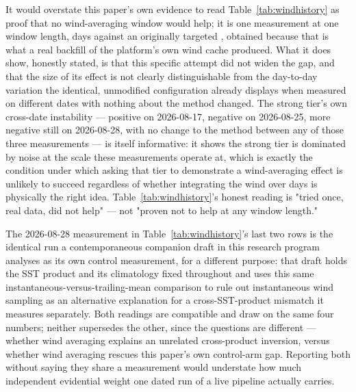  It would overstate
this paper's own evidence to read Table~\ref{tab:windhistory} as proof that
no wind-averaging window would help; it is one measurement at one window
length, \WindHistoryActualWindowDays{} days against an originally targeted
\WindHistoryTargetWindowDays{}, obtained because that is what a real
backfill of the platform's own wind cache produced. What it does show,
honestly stated, is that this specific attempt did not widen the gap, and
that the size of its effect is not clearly distinguishable from the
day-to-day variation the identical, unmodified configuration already
displays when measured on different dates with nothing about the method
changed. The strong tier's own cross-date instability --- positive on
2026-08-17, negative on 2026-08-25, more negative still on 2026-08-28, with
no change to the method between any of those three measurements --- is
itself informative: it shows the strong tier is dominated by noise at the
scale these measurements operate at, which is exactly the condition under
which asking that tier to demonstrate a wind-averaging effect is unlikely to
succeed regardless of whether integrating the wind over days is physically
the right idea. Table~\ref{tab:windhistory}'s honest reading is "tried once,
real data, did not help" --- not "proven not to help at any window length."

 The 2026-08-28 measurement
in Table~\ref{tab:windhistory}'s last two rows is the identical run a
contemporaneous companion draft in this research program analyses as its own
control measurement, for a different purpose: that draft holds the SST
product and its climatology fixed throughout and uses this same
instantaneous-versus-trailing-mean comparison to rule out instantaneous wind
sampling as an alternative explanation for a cross-SST-product mismatch it
measures separately. Both readings are compatible and draw on the same four
numbers; neither supersedes the other, since the questions are different ---
whether wind averaging explains an unrelated cross-product inversion, versus
whether wind averaging rescues this paper's own control-arm gap. Reporting
both without saying they share a measurement would understate how much
independent evidential weight one dated run of a live pipeline actually
carries.

